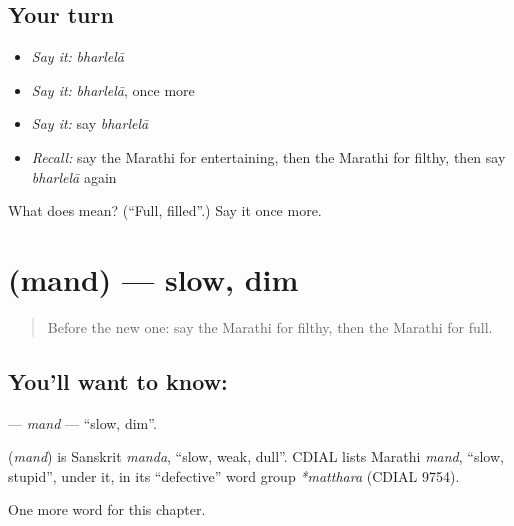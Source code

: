 \subsection*{Your turn}
\begin{itemize}
\raggedright
  \item \emph{Say it:} \emph{bharlelā}
  \item \emph{Say it:} \emph{bharlelā}, once more
  \item \emph{Say it:} say \emph{bharlelā}
  \item \emph{Recall:} say the Marathi for entertaining, then the Marathi for filthy, then say \emph{bharlelā} again
\end{itemize}

\begin{tcolorbox}[breakable,colback=teal!4,colframe=teal!35!black,title={Before you move on}]
What does  mean? (\textquotedblleft{}Full, filled\textquotedblright{}.) Say it once more.
\end{tcolorbox}
\section[\texorpdfstring{\mr{मंद} (mand)}{मंद (mand)}]{ (mand) — slow, dim}

\label{lesson:MR-C234-mand}



\begin{quote}
Before the new one: say the Marathi for filthy, then the Marathi for full.
\end{quote}

\subsection*{You'll want to know: }
\textbf{} — \emph{mand} — \textquotedblleft{}slow, dim\textquotedblright{}.

\begin{cousinweb}
\textbf{} (\emph{mand}) is Sanskrit \emph{manda}, \textquotedblleft{}slow, weak, dull\textquotedblright{}. CDIAL lists Marathi \emph{mand}, \textquotedblleft{}slow, stupid\textquotedblright{}, under it, in its \textquotedblleft{}defective\textquotedblright{} word group \emph{*matthara} (CDIAL 9754).
\end{cousinweb}

\begin{grammarlens}[title={What you've built}]
One more word for this chapter.
\end{grammarlens}

